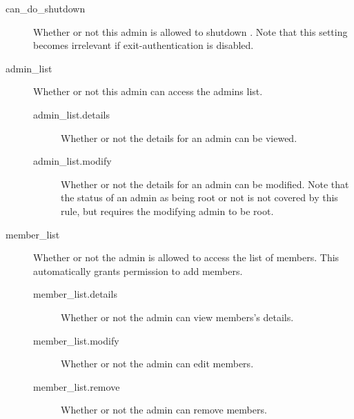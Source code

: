     \begin{description}
        \item [can\_do\_shutdown] Whether or not this admin is allowed to shutdown \srl. Note that this setting becomes irrelevant if exit-authentication is disabled.
        
        \item [admin\_list] Whether or not this admin can access the admins list.
        \begin{description}
            \item [admin\_list.details] Whether or not the details for an admin
                    can be viewed.
            \item [admin\_list.modify] Whether or not the details for an admin
                    can be modified. Note that the status of an admin as being
                    root or not is not covered by this rule, but requires the
                    modifying admin to be root.
        \end{description}
        
        \item [member\_list] Whether or not the admin is allowed to access the list of members. This automatically grants permission to add members.
        \begin{description}
            \item [member\_list.details] Whether or not the admin can view members's details.
            \item [member\_list.modify] Whether or not the admin can edit members.
            \item [member\_list.remove] Whether or not the admin can remove members.
        \end{description}
    \end{description}